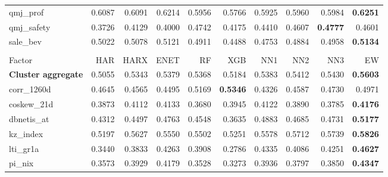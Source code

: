 \begin{longtable}{>{\raggedright\arraybackslash}p{2.6cm}rrrrrrrrr}
qmj\_prof & 0.6087 & \cellcolor{blue!10}0.6091 & \cellcolor{blue!10}0.6214 & 0.5956 & 0.5766 & 0.5925 & 0.5960 & 0.5984 & \textbf{\cellcolor{blue!10}0.6251} \\
qmj\_safety & 0.3726 & \cellcolor{blue!10}0.4129 & \cellcolor{blue!10}0.4000 & \cellcolor{blue!10}0.4742 & \cellcolor{blue!10}0.4175 & \cellcolor{blue!10}0.4410 & \cellcolor{blue!10}0.4607 & \textbf{\cellcolor{blue!10}0.4777} & \cellcolor{blue!10}0.4601 \\
sale\_bev & 0.5022 & \cellcolor{blue!10}0.5078 & \cellcolor{blue!10}0.5121 & 0.4911 & 0.4488 & 0.4753 & 0.4884 & 0.4958 & \textbf{\cellcolor{blue!10}0.5134} \\
\hline
\multicolumn{10}{@{}l}{\textit{Panel J. Seasonality}} \\
\hline
Factor & HAR & HARX & ENET & RF & XGB & NN1 & NN2 & NN3 & EW \\
\hline
\textbf{Cluster aggregate} & 0.5055 & \cellcolor{blue!10}0.5343 & \cellcolor{blue!10}0.5379 & \cellcolor{blue!10}0.5368 & \cellcolor{blue!10}0.5184 & \cellcolor{blue!10}0.5383 & \cellcolor{blue!10}0.5412 & \cellcolor{blue!10}0.5430 & \textbf{\cellcolor{blue!10}0.5603} \\
corr\_1260d & 0.4645 & 0.4565 & 0.4495 & \cellcolor{blue!10}0.5169 & \textbf{\cellcolor{blue!10}0.5346} & 0.4326 & 0.4587 & \cellcolor{blue!10}0.4730 & \cellcolor{blue!10}0.4971 \\
coskew\_21d & 0.3873 & \cellcolor{blue!10}0.4112 & \cellcolor{blue!10}0.4133 & 0.3680 & \cellcolor{blue!10}0.3945 & \cellcolor{blue!10}0.4122 & \cellcolor{blue!10}0.3890 & 0.3785 & \textbf{\cellcolor{blue!10}0.4176} \\
dbnetis\_at & 0.4312 & \cellcolor{blue!10}0.4497 & \cellcolor{blue!10}0.4763 & \cellcolor{blue!10}0.4548 & 0.3635 & \cellcolor{blue!10}0.4883 & \cellcolor{blue!10}0.4685 & \cellcolor{blue!10}0.4731 & \textbf{\cellcolor{blue!10}0.5177} \\
kz\_index & 0.5197 & \cellcolor{blue!10}0.5627 & \cellcolor{blue!10}0.5550 & \cellcolor{blue!10}0.5502 & \cellcolor{blue!10}0.5251 & \cellcolor{blue!10}0.5578 & \cellcolor{blue!10}0.5712 & \cellcolor{blue!10}0.5739 & \textbf{\cellcolor{blue!10}0.5826} \\
lti\_gr1a & 0.3440 & \cellcolor{blue!10}0.3833 & \cellcolor{blue!10}0.4263 & \cellcolor{blue!10}0.3908 & 0.2786 & \cellcolor{blue!10}0.4335 & \cellcolor{blue!10}0.4086 & \cellcolor{blue!10}0.4251 & \textbf{\cellcolor{blue!10}0.4627} \\
pi\_nix & 0.3573 & \cellcolor{blue!10}0.3929 & \cellcolor{blue!10}0.4179 & 0.3528 & 0.3273 & \cellcolor{blue!10}0.3936 & \cellcolor{blue!10}0.3797 & \cellcolor{blue!10}0.3850 & \textbf{\cellcolor{blue!10}0.4347} \\

\end{longtable}
